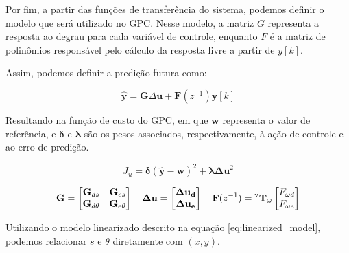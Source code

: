 Por fim, a partir das funções de transferência do sistema,
podemos definir o modelo que será utilizado no GPC.
Nesse modelo, a matriz $G$ representa a resposta ao degrau para cada variável de controle,
enquanto $F$ é a matriz de polinômios responsável pelo cálculo da
resposta livre a partir de $y[k]$.

Assim, podemos definir a predição futura como: 

\begin{equation}
\hat{\mathbf{y}} = \mathbf{G} \Delta \mathbf{u} + \mathbf{F}(z^{-1}) \mathbf{y}[k]
\end{equation}

Resultando na função de custo do GPC, em que $\mathbf{w}$ representa o valor de 
referência, e $\boldsymbol{\delta}$ e $\boldsymbol{\lambda}$ são os pesos associados, 
respectivamente, à ação de controle e ao erro de predição.

\begin{equation}
J_u = \boldsymbol{\delta} (\hat{\mathbf{y}} - \mathbf{w})^2 + \boldsymbol{\lambda} \mathbf{\Delta u}^2
\end{equation}

\[
\mathbf{G} = 
\begin{bmatrix}
\mathbf{G}_{d s} & \mathbf{G}_{e s}\\
\mathbf{G}_{d \theta}  & \mathbf{G}_{e \theta}
\end{bmatrix}
\quad
\mathbf{\Delta u} =
\begin{bmatrix}
\mathbf{\Delta u_d} \\
\mathbf{\Delta u_e}
\end{bmatrix}
\quad
\mathbf{F}(z^{-1}) =
\mathbf{\prescript{\text{v}}{}{T_{\omega}}}
\begin{bmatrix}
F_{\omega d} \\
F_{\omega e}
\end{bmatrix}
\]

Utilizando o modelo linearizado descrito na equação \ref{eq:linearized_model},
podemos relacionar $s$ e $\theta$ diretamente com $(x, y)$.
